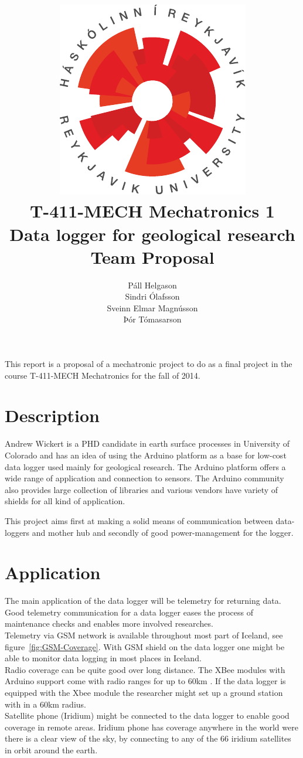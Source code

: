 \documentclass[12pt,a4paper,titlepage]{article}
\author{Páll Helgason\\Sindri Ólafsson\\Sveinn Elmar Magnússon\\Þór Tómasarson}  %
\title{\includegraphics{graphics/ru-logo}\\\vspace{10mm}
T-411-MECH Mechatronics 1\\Data logger for geological research\\Team Proposal}  %
\begin{document}
\maketitle  %
\onehalfspacing %

This report is a proposal of a mechatronic project to do as a
final project in the course T-411-MECH Mechatronics for the fall of 2014.
 

\section{Description}
Andrew Wickert is a PHD candidate in earth surface processes in University of Colorado and has an 
idea of using the Arduino platform as a base for low-cost data logger used mainly
for geological research. The Arduino platform offers a wide range of application and connection to 
sensors. The Arduino community also provides large collection of libraries and various vendors have 
variety of shields for all kind of application. 

This project aims first at making a solid means of communication between data-loggers and mother hub
and secondly of good power-management for the logger.

\section{Application}
The main application of the data logger will be telemetry for returning data. Good telemetry communication for a data logger eases the process of maintenance checks and enables more involved researches.\\
Telemetry via GSM network is available throughout most part of Iceland, see figure~\ref{fig:GSM-Coverage}. With GSM shield on the data logger one might be able to monitor data logging in most places in Iceland.\\
Radio coverage can be quite good over long distance. The XBee modules with Arduino support come with radio ranges for up to 60km \cite{Xbee}. If the data logger is equipped with the Xbee module the researcher might set up a ground station with in a 60km radius.\\
Satellite phone (Iridium) might be connected to the data logger to enable good coverage in remote areas. Iridium phone has coverage anywhere in the world were there is a clear view of the sky, by connecting to any of the 66 iridium satellites in orbit around the earth\cite{iridium}.
\end{document}
